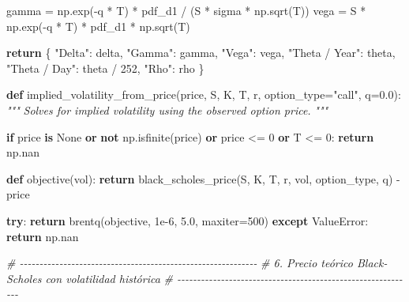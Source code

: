 \documentclass[
  11pt,
]{article}
\newenvironment{Shaded}{}{}
\newcommand{\CommentTok}[1]{\textcolor[rgb]{0.38,0.63,0.69}{\textit{#1}}}
\newcommand{\ControlFlowTok}[1]{\textcolor[rgb]{0.00,0.44,0.13}{\textbf{#1}}}
\newcommand{\DecValTok}[1]{\textcolor[rgb]{0.25,0.63,0.44}{#1}}
\newcommand{\FloatTok}[1]{\textcolor[rgb]{0.25,0.63,0.44}{#1}}
\newcommand{\KeywordTok}[1]{\textcolor[rgb]{0.00,0.44,0.13}{\textbf{#1}}}
\newcommand{\NormalTok}[1]{#1}
\newcommand{\OperatorTok}[1]{\textcolor[rgb]{0.40,0.40,0.40}{#1}}
\newcommand{\PreprocessorTok}[1]{\textcolor[rgb]{0.74,0.48,0.00}{#1}}
\newcommand{\StringTok}[1]{\textcolor[rgb]{0.25,0.44,0.63}{#1}}
\newcommand{\VariableTok}[1]{\textcolor[rgb]{0.10,0.09,0.49}{#1}}
\begin{document}
\begin{Shaded}
\begin{Highlighting}[]
\NormalTok{    gamma }\OperatorTok{=}\NormalTok{ np.exp(}\OperatorTok{{-}}\NormalTok{q }\OperatorTok{*}\NormalTok{ T) }\OperatorTok{*}\NormalTok{ pdf\_d1 }\OperatorTok{/}\NormalTok{ (S }\OperatorTok{*}\NormalTok{ sigma }\OperatorTok{*}\NormalTok{ np.sqrt(T))}
\NormalTok{    vega }\OperatorTok{=}\NormalTok{ S }\OperatorTok{*}\NormalTok{ np.exp(}\OperatorTok{{-}}\NormalTok{q }\OperatorTok{*}\NormalTok{ T) }\OperatorTok{*}\NormalTok{ pdf\_d1 }\OperatorTok{*}\NormalTok{ np.sqrt(T)}

    \ControlFlowTok{return}\NormalTok{ \{}
        \StringTok{"Delta"}\NormalTok{: delta,}
        \StringTok{"Gamma"}\NormalTok{: gamma,}
        \StringTok{"Vega"}\NormalTok{: vega,}
        \StringTok{"Theta / Year"}\NormalTok{: theta,}
        \StringTok{"Theta / Day"}\NormalTok{: theta }\OperatorTok{/} \DecValTok{252}\NormalTok{,}
        \StringTok{"Rho"}\NormalTok{: rho}
\NormalTok{    \}}


\KeywordTok{def}\NormalTok{ implied\_volatility\_from\_price(price, S, K, T, r, option\_type}\OperatorTok{=}\StringTok{"call"}\NormalTok{, q}\OperatorTok{=}\FloatTok{0.0}\NormalTok{):}
    \CommentTok{"""}
\CommentTok{    Solves for implied volatility using the observed option price.}
\CommentTok{    """}

    \ControlFlowTok{if}\NormalTok{ price }\KeywordTok{is} \VariableTok{None} \KeywordTok{or} \KeywordTok{not}\NormalTok{ np.isfinite(price) }\KeywordTok{or}\NormalTok{ price }\OperatorTok{\textless{}=} \DecValTok{0} \KeywordTok{or}\NormalTok{ T }\OperatorTok{\textless{}=} \DecValTok{0}\NormalTok{:}
        \ControlFlowTok{return}\NormalTok{ np.nan}

    \KeywordTok{def}\NormalTok{ objective(vol):}
        \ControlFlowTok{return}\NormalTok{ black\_scholes\_price(S, K, T, r, vol, option\_type, q) }\OperatorTok{{-}}\NormalTok{ price}

    \ControlFlowTok{try}\NormalTok{:}
        \ControlFlowTok{return}\NormalTok{ brentq(objective, }\FloatTok{1e{-}6}\NormalTok{, }\FloatTok{5.0}\NormalTok{, maxiter}\OperatorTok{=}\DecValTok{500}\NormalTok{)}
    \ControlFlowTok{except} \PreprocessorTok{ValueError}\NormalTok{:}
        \ControlFlowTok{return}\NormalTok{ np.nan}


\CommentTok{\# {-}{-}{-}{-}{-}{-}{-}{-}{-}{-}{-}{-}{-}{-}{-}{-}{-}{-}{-}{-}{-}{-}{-}{-}{-}{-}{-}{-}{-}{-}{-}{-}{-}{-}{-}{-}{-}{-}{-}{-}{-}{-}{-}{-}{-}{-}{-}{-}{-}{-}{-}{-}{-}{-}{-}{-}{-}{-}{-}{-}}
\CommentTok{\# 6. Precio teórico Black{-}Scholes con volatilidad histórica}
\CommentTok{\# {-}{-}{-}{-}{-}{-}{-}{-}{-}{-}{-}{-}{-}{-}{-}{-}{-}{-}{-}{-}{-}{-}{-}{-}{-}{-}{-}{-}{-}{-}{-}{-}{-}{-}{-}{-}{-}{-}{-}{-}{-}{-}{-}{-}{-}{-}{-}{-}{-}{-}{-}{-}{-}{-}{-}{-}{-}{-}{-}{-}}


\end{Highlighting}
\end{Shaded}
\end{document}
